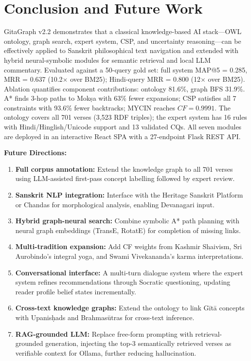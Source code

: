 \documentclass[conference]{IEEEtran}
\begin{document}
\section{Conclusion and Future Work}

GitaGraph v2.2 demonstrates that a classical knowledge-based AI stack—OWL
ontology, graph search, expert system, CSP, and uncertainty reasoning—can be
effectively applied to Sanskrit philosophical text navigation and extended with
hybrid neural-symbolic modules for semantic retrieval and local LLM commentary.
Evaluated against a 50-query gold set: full system MAP@5 = 0.285, MRR = 0.637
(10.2$\times$ over BM25); Hindi-query MRR = 0.800 (12$\times$ over BM25).
Ablation quantifies component contributions: ontology 81.6\%, graph BFS 31.9\%.
A* finds 3-hop paths to Mok\d{s}a with 63\% fewer expansions; CSP satisfies all
7 constraints with 93.6\% fewer backtracks; MYCIN reaches $CF = 0.9991$.
The ontology covers all 701 verses (3,523 RDF triples); the expert system has
16 rules with Hindi/Hinglish/Unicode support and 13 validated CQs.
All seven modules are deployed in an interactive React SPA with a 27-endpoint
Flask REST API.

\textbf{Future Directions:}
\begin{enumerate}[leftmargin=*]
  \item \textbf{Full corpus annotation:} Extend the knowledge graph to all 701
        verses using LLM-assisted first-pass concept labelling followed by
        expert review.
  \item \textbf{Sanskrit NLP integration:} Interface with the Heritage Sanskrit
        Platform or Chandas for morphological analysis, enabling Devanagari input.
  \item \textbf{Hybrid graph-neural search:} Combine symbolic A* path planning with
        neural graph embeddings (TransE, RotatE) for completion of missing links.
  \item \textbf{Multi-tradition expansion:} Add CF weights from Kashmir Shaivism,
        Sri Aurobindo's integral yoga, and Swami Vivekananda's karma interpretations.
  \item \textbf{Conversational interface:} A multi-turn dialogue system where the
        expert system refines recommendations through Socratic questioning, updating
        reader profile belief states incrementally.
  \item \textbf{Cross-text knowledge graphs:} Extend the ontology to link G\={i}t\={a}
        concepts with Upanis\d{h}ads and Brahmas\={u}tras for cross-text inference.
  \item \textbf{RAG-grounded LLM:} Replace free-form prompting with
        retrieval-grounded generation, injecting the top-3 semantically retrieved
        verses as verifiable context for Ollama, further reducing hallucination.
\end{enumerate}
\end{document}

